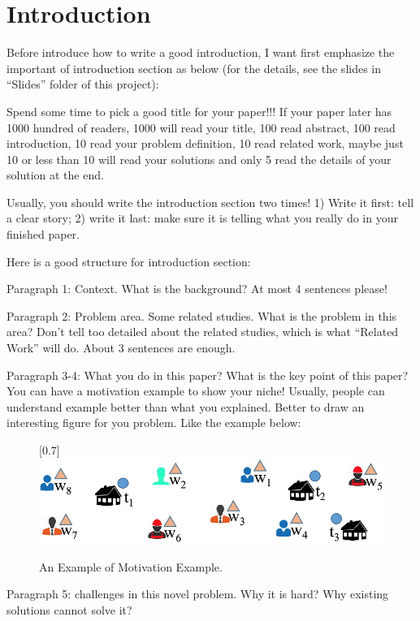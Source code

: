 \section{Introduction}

Before introduce how to write a good introduction, I want first emphasize the important of introduction section as below (for the details, see the slides in ``Slides'' folder of this project):

Spend some time to pick a good title for your paper!!! If your paper later has 1000 hundred of readers, 1000 will read your title, 100 read abstract, 100 read introduction, 10 read your problem definition, 10 read related work, maybe just 10 or less than 10 will read your solutions and only 5 read the details of your solution at the end.


Usually, you should write the introduction section two times! 1) Write it first: tell a clear story; 2) write it last: make sure it is telling what you really do in your finished paper.

Here is a good structure for introduction section:

Paragraph 1: Context. What is the background? At most 4 sentences please!

Paragraph 2: Problem area. Some related studies. What is the problem in this area? Don't tell too detailed about the related studies, which is what ``Related Work'' will do.  About 3 sentences are enough.

Paragraph 3-4: What you do in this paper? What is the key point of this paper? You can have a motivation example to show your niche! Usually, people can understand example better than what you explained. Better to draw an interesting figure for you problem. Like the example \cite{cheng2016task} below:

\begin{figure}[h!]\centering
	\scalebox{0.7}[0.7]{\includegraphics{../figures/motivation_example.eps}}
	\caption{\small An Example of Motivation Example.}
	\label{fig:bbq_example}
\end{figure}

Paragraph 5: challenges in this novel problem. Why it is hard? Why existing solutions cannot solve it?

